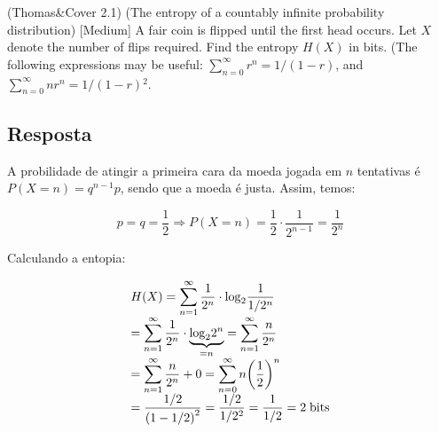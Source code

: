 (Thomas\&Cover 2.1) (The entropy of a countably infinite probability distribution) [Medium] A fair coin is flipped until the first head occurs. Let $X$ denote the number of flips required. Find the entropy $H(X)$ in bits. (The following expressions may be useful: $\sum\nolimits_{n = 0}^\infty  {{r^n} = 1/(1 - r)} $, and $\sum\nolimits_{n = 0}^\infty  {n{r^n} = 1/(1 - r){^2}} $.

\subsection*{Resposta}

A probilidade de atingir a primeira cara da moeda jogada em $n$ tentativas é $P(X=n) = q^{n-1}p$, sendo que a moeda é justa. Assim, temos:

\[p = q = \frac{1}{2} \Rightarrow P(X = n) = \frac{1}{2} \cdot \frac{1}{{{2^{n - 1}}}} = \frac{1}{{{2^n}}}\]

Calculando a entopia:

\[\begin{array}{l}
\displaystyle H(X) = \sum\limits_{n = 1}^\infty  {\frac{1}{{{2^n}}} \cdot {{\log }_2}\frac{1}{{1/{2^n}}}} \\
\displaystyle = \sum\limits_{n = 1}^\infty  {\frac{1}{{{2^n}}} \cdot \underbrace {{{\log }_2}{2^n}}_{ = n}}  = \sum\limits_{n = 1}^\infty  {\frac{n}{{{2^n}}}} \\
\displaystyle = \sum\limits_{n = 1}^\infty  {\frac{n}{{{2^n}}}}  + 0 = \sum\limits_{n = 0}^\infty  {n{{\left( {\frac{1}{2}} \right)}^n}} \\
\displaystyle = \frac{{1/2}}{{{{\left( {1 - 1/2} \right)}^2}}} = \frac{{1/2}}{{1/{2^2}}} = \frac{1}{{1/2}} = 2\;{\rm{bits}}
\end{array}\]

